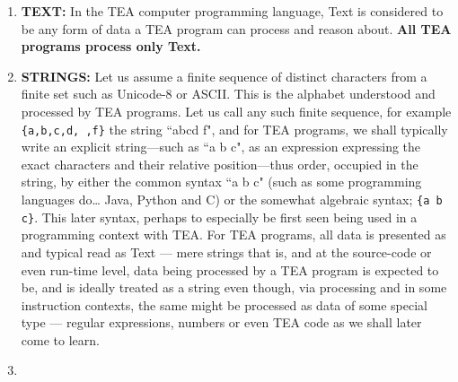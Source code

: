 \documentclass[a4paper, 18pt]{book} %
\begin{document}
\begin{enumerate}
\item{ \textbf{TEXT:} In the TEA computer programming language, Text is considered to be any form of data a TEA program can process and reason about. \textbf{All TEA programs process only Text.}}
\item{ 
\textbf{STRINGS:} Let us assume a finite sequence of distinct characters from a finite set such as Unicode-8 or ASCII. This is the alphabet understood and processed by TEA programs. Let us call any such finite sequence, for example \verb!{a,b,c,d, ,f}! the string ``abcd f", and for TEA programs, we shall typically write an explicit string---such as ``a b c", as an expression expressing the exact characters and their relative position---thus order, occupied in the string, by either the common syntax ``a b c" (such as some programming languages do… Java, Python and C) or the somewhat algebraic syntax; \verb!{a b c}!. This later syntax, perhaps to especially be first seen being used in a programming context with TEA. For TEA programs, all data is presented as and typical read as Text --- mere strings that is, and at the source-code or even run-time level, data being processed by a TEA program is expected to be, and is ideally treated as a string even though, via processing and in some instruction contexts, the same might be processed as data of some special type --- regular expressions, numbers or even TEA code as we shall later come to learn.
}
\item{
}
\end{enumerate}
\end{document}
